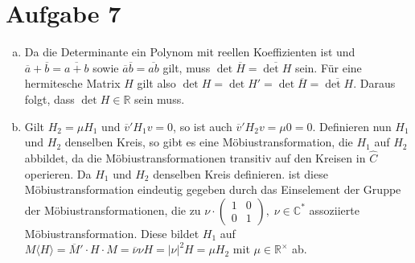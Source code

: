 \documentclass{article}
\theoremstyle{definition}
\newcommand{\R}{\mathbb{R}}
\newcommand{\C}{\mathbb{C}}
\begin{document}
\section*{Aufgabe 7}
\begin{enumerate}[(a)]
	\item Da die Determinante ein Polynom mit reellen Koeffizienten ist und $\overline{a} + \overline{b} = \overline{a+b}$ sowie $\overline{a}\overline{b} = \overline{ab}$ gilt, muss $\det \overline{H} = \overline{\det H}$ sein. Für eine hermitesche Matrix $H$ gilt also $\det H = \det H' = \det \overline{H} = \overline{\det H}$. Daraus folgt, dass $\det H \in \R$ sein muss.
	\item Gilt $H_2 = \mu H_1$ und $\overline{v}'H_1v = 0$, so ist auch $\overline{v}'H_2v = \mu 0 = 0$.
	Definieren nun $H_1$ und $H_2$ denselben Kreis, so gibt es eine Möbiustransformation, die $H_1$ auf $H_2$ abbildet, da die Möbiustransformationen transitiv auf den Kreisen in $\hat{C}$ operieren. Da $H_1$ und $H_2$ denselben Kreis definieren. ist diese Möbiustransformation eindeutig gegeben durch das Einselement der Gruppe der Möbiustransformationen, die zu $\nu \cdot \begin{pmatrix}
		1 & 0 \\ 0 & 1
	\end{pmatrix},\; \nu \in \C^*$ assoziierte Möbiustransformation. Diese bildet $H_1$ auf $M\langle H\rangle = \overline{M}'\cdot H \cdot M = \overline{\nu}\nu H = |\nu|^2 H = \mu H_2$ mit $\mu\in\R^\times$ ab.
\end{enumerate}
\end{document}
